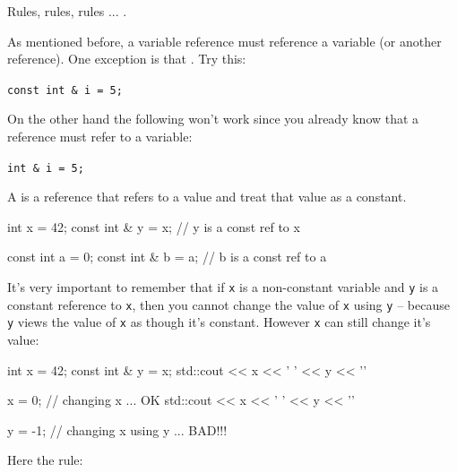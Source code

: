 
Rules, rules, rules ... .






As mentioned before, a variable reference must reference a variable (or another reference). One exception is that . Try this:

\verb!const int & i = 5;!

On the other hand the following won't work since you
already know that a reference must refer to a variable:

\verb!int & i = 5;!

A  is a reference that refers to a value and
treat that value as a constant.

\begin{consolethree}[escapeinside=||]
int x = 42;
const int & y = x; // y is a const ref to x

const int a = 0;
const int & b = a; // b is a const ref to a
\end{consolethree}

It's very important to remember that if \texttt{x} is a non-constant variable and \texttt{y} is a constant reference to \texttt{x}, then you cannot change the value of \texttt{x} using \texttt{y} -- because \texttt{y} views the value of \texttt{x} as though it's constant. However \texttt{x} can still change it's value:

\begin{consolethree}[escapeinside=||]
int x = 42;
const int & y = x;
std::cout << x << ' ' << y << '\n'

x = 0; // changing x ... OK
std::cout << x << ' ' << y << '\n'

y = -1; // changing x using y ... BAD!!!
\end{consolethree}



Here the rule: 


